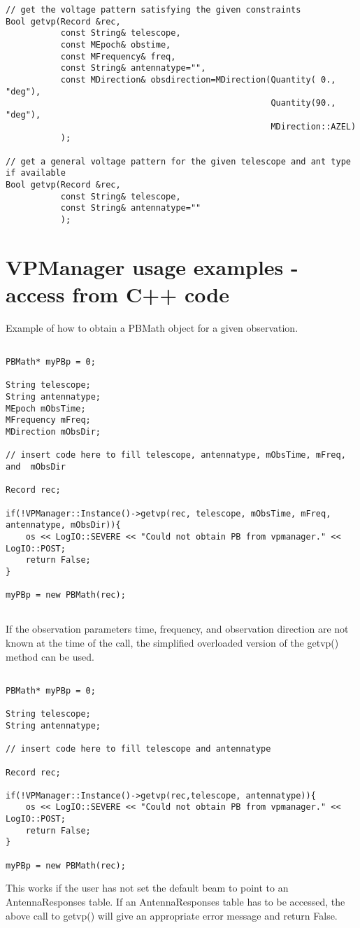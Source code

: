 \documentclass[12pt]{article}
\begin{document}
{\begin{verbatim}
// get the voltage pattern satisfying the given constraints
Bool getvp(Record &rec,
           const String& telescope,
           const MEpoch& obstime,
           const MFrequency& freq, 
           const String& antennatype="", 
           const MDirection& obsdirection=MDirection(Quantity( 0., "deg"),
                                                     Quantity(90., "deg"), 
                                                     MDirection::AZEL)
           ); 

// get a general voltage pattern for the given telescope and ant type if available
Bool getvp(Record &rec,
           const String& telescope,
           const String& antennatype=""
           ); 

\end{verbatim}
}

\newpage

\section{VPManager usage examples - access from C++ code}
\label{appVPManex}

Example of how to obtain a PBMath object for a given observation.
{\small
\begin{verbatim}

PBMath* myPBp = 0;	

String telescope; 
String antennatype;
MEpoch mObsTime;
MFrequency mFreq;
MDirection mObsDir;

// insert code here to fill telescope, antennatype, mObsTime, mFreq, and  mObsDir

Record rec;

if(!VPManager::Instance()->getvp(rec, telescope, mObsTime, mFreq, antennatype, mObsDir)){
    os << LogIO::SEVERE << "Could not obtain PB from vpmanager." << LogIO::POST;
    return False;
}

myPBp = new PBMath(rec);


\end{verbatim}
}
\newpage

If the observation parameters time, frequency, and observation direction are not known
at the time of the call, the simplified overloaded version of the getvp() method can
be used.
{\small
\begin{verbatim}

PBMath* myPBp = 0;	

String telescope; 
String antennatype;

// insert code here to fill telescope and antennatype

Record rec;

if(!VPManager::Instance()->getvp(rec,telescope, antennatype)){
    os << LogIO::SEVERE << "Could not obtain PB from vpmanager." << LogIO::POST;
    return False;
}

myPBp = new PBMath(rec);

\end{verbatim}
}
This works if the user has not set the default beam to point to an AntennaResponses table.
If an AntennaResponses table has to be accessed, the above
call to getvp() will give an appropriate error message and return False.
\end{document}
